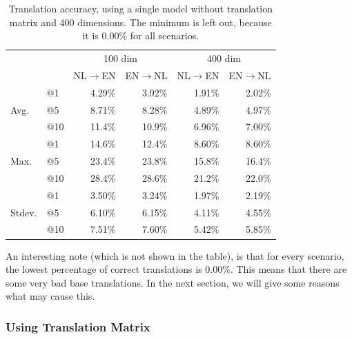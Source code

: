 \begin{table}[ht!]
  \centering
  \label{table:results_single_model_no_matrix}
  \begin{tabular}{ll|r|r|r|r|}
  \cline{3-6}                                       &     & \multicolumn{2}{|c|}{100 dim} & \multicolumn{2}{c|}{400 dim} \\ \cline{3-6} 
                                                    &     & NL$\to$EN   & EN$\to$NL       & NL$\to$EN   & EN$\to$NL      \\ \hline
    \multicolumn{1}{|l|}{\multirow{3}{*}{Avg.}}     & @1  & 4.29\%      & 3.92\%          & 1.91\%      & 2.02\%         \\ \cline{2-6} 
    \multicolumn{1}{|l|}{}                          & @5  & 8.71\%      & 8.28\%          & 4.89\%      & 4.97\%         \\ \cline{2-6} 
    \multicolumn{1}{|l|}{}                          & @10 & 11.4\%      & 10.9\%          & 6.96\%      & 7.00\%         \\ \hline 
    \multicolumn{1}{|l|}{\multirow{3}{*}{Max.}}     & @1  & 14.6\%      & 12.4\%          & 8.60\%      & 8.60\%         \\ \cline{2-6} 
    \multicolumn{1}{|l|}{}                          & @5  & 23.4\%      & 23.8\%          & 15.8\%      & 16.4\%         \\ \cline{2-6} 
    \multicolumn{1}{|l|}{}                          & @10 & 28.4\%      & 28.6\%          & 21.2\%      & 22.0\%         \\ \hline
    \multicolumn{1}{|l|}{\multirow{3}{*}{Stdev.}}   & @1  & 3.50\%      & 3.24\%          & 1.97\%      & 2.19\%         \\ \cline{2-6} 
    \multicolumn{1}{|l|}{}                          & @5  & 6.10\%      & 6.15\%          & 4.11\%      & 4.55\%         \\ \cline{2-6} 
    \multicolumn{1}{|l|}{}                          & @10 & 7.51\%      & 7.60\%          & 5.42\%      & 5.85\%         \\ \hline
  \end{tabular}
  \caption{Translation accuracy, using a single model without translation matrix and 400 dimensions. The minimum is left out, because it is 0.00\% for all scenarios.}
\end{table}

An interesting note (which is not shown in the table), is that for every scenario, the lowest percentage of correct translations is 0.00\%. This means that there are some very bad base translations. In the next section, we will give some reasons what may cause this.

\subsubsection{Using Translation Matrix}
